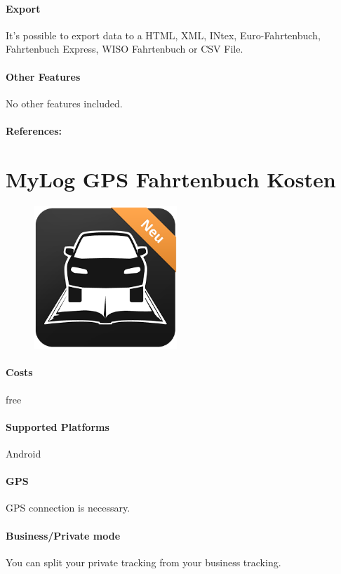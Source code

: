 \paragraph{Export} It’s possible to export data to a HTML, XML, INtex, Euro-Fahrtenbuch, Fahrtenbuch Express, WISO Fahrtenbuch or CSV File.
\paragraph{Other Features} No other features included.
\paragraph{References:} \cite{Fahrtenbuch_myLogbook}
\newpage

\section{MyLog GPS Fahrtenbuch Kosten}
\begin{figure}
  \begin{center}
    \includegraphics[width=0.48\textwidth]{bilder/mylog}
  \end{center}
\end{figure}
\paragraph{Costs} free
\paragraph{Supported Platforms} Android
\paragraph{GPS} GPS connection is necessary.
\paragraph{Business/Private mode} You can split your private tracking from your business tracking.
